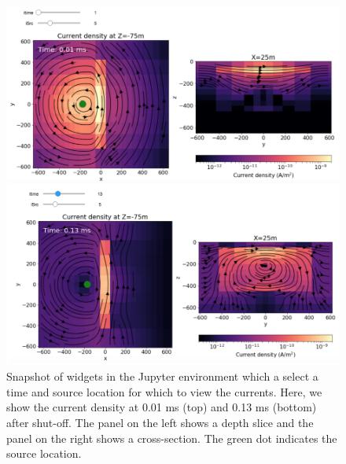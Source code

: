 \begin{figure}
    \begin{center}
    \includegraphics[width=0.8\columnwidth]{figures/currents-widget.png}
    \end{center}
\caption{
    Snapshot of widgets in the Jupyter environment which a select a time and source location for which to view the currents. Here, we show the current density at 0.01 ms (top) and 0.13 ms (bottom) after shut-off. The panel on the left shows a depth slice and the panel on the right shows a cross-section. The green dot indicates the source location.
}
\label{fig:currents-widget}
\end{figure}

